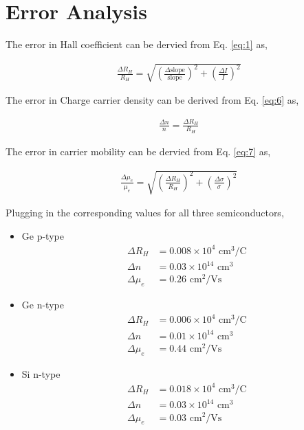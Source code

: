 \section{Error Analysis}

The error in Hall coefficient can be dervied from Eq. \ref{eq:1} as,

\begin{align}
    \frac{\Delta R_H}{R_H} = \sqrt{\left(\frac{\Delta\text{slope}}{\text{slope}}\right)^2 + \left(\frac{\Delta I}{I}\right)^2}
\end{align}

The error in Charge carrier density can be derived from Eq. \ref{eq:6} as,

\begin{align}
    \frac{\Delta n}{n} = \frac{\Delta R_H}{R_H}
\end{align}

The error in carrier mobility can be dervied from Eq. \ref{eq:7} as, 

\begin{align}
    \frac{\Delta \mu_e}{\mu_e} = \sqrt{\left(\frac{\Delta R_H}{R_H}\right)^2 + \left(\frac{\Delta \sigma}{\sigma}\right)^2}
\end{align}

Plugging in the corresponding values for all three semiconductors,\\

\begin{itemize}
    \item Ge p-type
    \begin{align*}
        \Delta R_H &= 0.008 \times 10^4 \text{ cm}^3/\text{C}\\
        \Delta n &= 0.03 \times 10^{14} \text{ cm}^3\\
        \Delta \mu_e &= 0.26 \text{ cm}^2/\text{Vs}
    \end{align*}
    \item Ge n-type
    \begin{align*}
        \Delta R_H &= 0.006 \times 10^4 \text{ cm}^3/\text{C}\\
        \Delta n &= 0.01 \times 10^{14} \text{ cm}^3\\
        \Delta \mu_e &= 0.44 \text{ cm}^2/\text{Vs}
    \end{align*}
    \item Si n-type
    \begin{align*}
        \Delta R_H &= 0.018 \times 10^4 \text{ cm}^3/\text{C}\\
        \Delta n &= 0.03 \times 10^{14} \text{ cm}^3\\
        \Delta \mu_e &= 0.03 \text{ cm}^2/\text{Vs}
    \end{align*}
\end{itemize}




